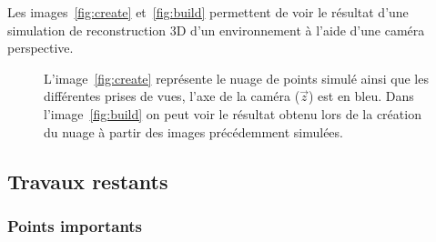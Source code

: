\vspace{5mm}
Les images~\ref{fig:create} et~\ref{fig:build} permettent de voir le résultat d'une simulation de reconstruction 3D d'un environnement à l'aide d'une caméra perspective.
\begin{figure}[htp]
\begin{center}
\caption{L'image~\ref{fig:create} représente le nuage de points simulé ainsi que les différentes prises de vues, l'axe de la caméra ($\vec{z}$) est en bleu. Dans l'image~\ref{fig:build} on peut voir le résultat obtenu lors de la création du nuage à partir des images précédemment simulées.}
\end{center}
\end{figure}
\subsection{Travaux restants}

\subsubsection{Points importants}

